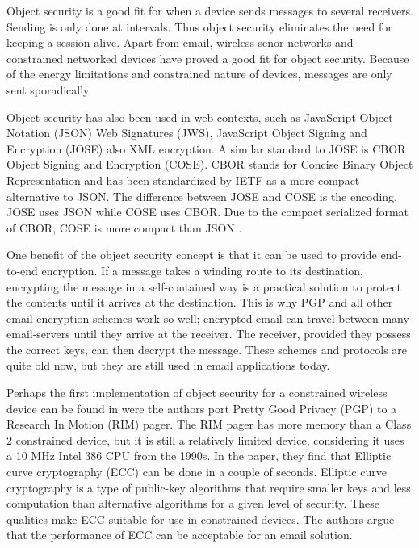 Object security is a good fit for when a device sends messages to several receivers. Sending is only done at intervals. Thus object security eliminates the need for keeping a session alive. 
Apart from email, wireless senor networks and constrained networked devices have proved a good fit for object security. Because of the energy limitations and constrained nature of devices, messages are only sent sporadically.

Object security has also been used in web contexts, such as JavaScript Object Notation (JSON) Web Signatures (JWS)\cite{jones2015json}, JavaScript Object Signing and Encryption (JOSE)\cite{barnes2014use} also XML encryption\cite{imamura2013xml}. A similar standard to JOSE is CBOR Object Signing and Encryption (COSE)\cite{schaad2017cbor}.  CBOR stands for Concise Binary Object Representation and has been standardized by IETF as a more compact alternative to JSON\cite{rfc7049}. The difference between JOSE and COSE is the encoding, JOSE uses JSON while COSE uses CBOR. Due to the compact serialized format of CBOR, COSE is more compact than JSON \cite{kalvoda2015implementace}.

One benefit of the object security concept is that it can be used to provide end-to-end encryption. If a message takes a winding route to its destination, encrypting the message in a self-contained way is a practical solution to protect the contents until it arrives at the destination. This is why PGP and all other email encryption schemes work so well; encrypted email can travel between many email-servers until they arrive at the receiver. The receiver, provided they possess the correct keys, can then decrypt the message. These schemes and protocols are quite old now, but they are still used in email applications today. 

Perhaps the first implementation of object security for a constrained wireless device can be found in \cite{brown2000pgp} were the authors port Pretty Good Privacy (PGP) to a Research In Motion (RIM) pager. The RIM pager has more memory than a Class 2 constrained device, but it is still a relatively limited device, considering it uses a 10 MHz Intel 386 CPU from the 1990s. In the paper, they find that Elliptic curve cryptography (ECC) can be done in a couple of seconds. Elliptic curve cryptography is a type of public-key algorithms that require smaller keys and less computation than alternative algorithms for a given level of security. These qualities make ECC suitable for use in constrained devices. The authors argue that the performance of ECC can be acceptable for an email solution.

